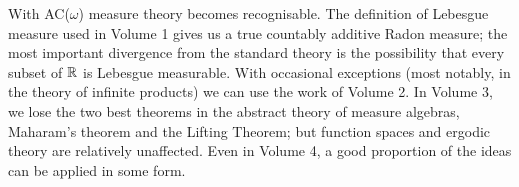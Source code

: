 
\def\chaptername{Choice and determinacy}
\def\sectionname{Countable choice}

\def\spwidehat{\widehat{\phantom{m}}}


With AC($\omega$) measure theory becomes recognisable.   The
definition of Lebesgue measure used in Volume 1 gives us a true
countably additive Radon measure;  the most important divergence from the
standard theory is the possibility that every subset of $\Bbb R$ is
Lebesgue measurable.
With occasional exceptions (most
notably, in the theory of infinite products) we can use the work of Volume
2.   In Volume 3, we lose the two best theorems in the abstract
theory of measure algebras, Maharam's theorem and the Lifting Theorem;
but function spaces and ergodic theory are relatively unaffected.
Even in Volume 4, a good proportion of the ideas can be applied in some
form.

